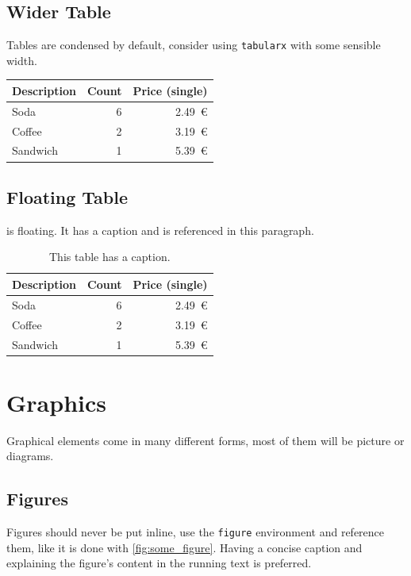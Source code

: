\subsection{Wider Table}

Tables are condensed by default, consider using \texttt{tabularx} with some sensible width.

\begin{center}
\begin{tabularx}{0.75\textwidth}{Xrr}
	\toprule
	Description & Count & Price (single)\\
	\midrule
	Soda & 6 & 2.49~€\\
	Coffee & 2 & 3.19~€\\
	Sandwich & 1 & 5.39~€\\
	\bottomrule
\end{tabularx}
\end{center}

\subsection{Floating Table}

 is floating.
It has a caption and is referenced in this paragraph.

\begin{table}
	\centering
	\begin{tabularx}{0.75\textwidth}{Xrr}
		\toprule
		Description & Count & Price (single)\\
		\midrule
		Soda & 6 & 2.49~€\\
		Coffee & 2 & 3.19~€\\
		Sandwich & 1 & 5.39~€\\
		\bottomrule
	\end{tabularx}
	\caption{This table has a caption.}
	\label{tbl:some_table}
\end{table}

\section{Graphics}

Graphical elements come in many different forms, most of them will be picture or diagrams.

\subsection{Figures}

Figures should never be put inline, use the \texttt{figure} environment and reference them, like it is done with \cref{fig:some_figure}.
Having a concise caption and explaining the figure's content in the running text is preferred.

